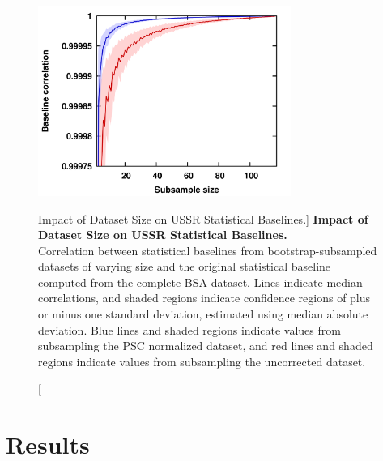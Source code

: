 \begin{figure}
\includegraphics[width=3.25in]{figs/ussr/04-blcorr.png}
\caption
      [Impact of Dataset Size on USSR Statistical Baselines.]{
  {\bf Impact of Dataset Size on USSR Statistical Baselines.}
  \\
  Correlation between statistical baselines from bootstrap-subsampled datasets
  of varying size and the original statistical baseline computed from the
  complete BSA dataset. Lines indicate median correlations, and shaded regions
  indicate confidence regions of plus or minus one standard deviation,
  estimated using median absolute deviation. Blue lines and shaded regions
  indicate values from subsampling the PSC normalized dataset, and red lines
  and shaded regions indicate values from subsampling the uncorrected dataset.
}
\label{figure.7.4}
\end{figure}

\section{Results}

